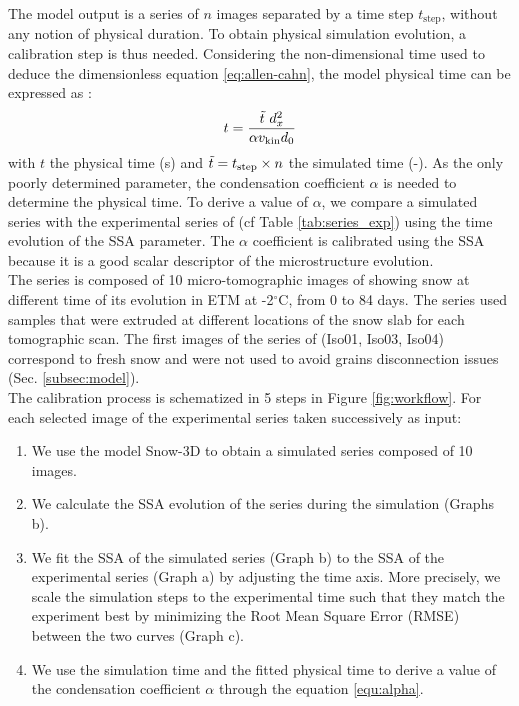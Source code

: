 \documentclass[draft,ms]{agujournal2019}
\begin{document}
 The model output is a series of $n$ images separated by a time step $t_{\mathrm{step}}$, without any notion of physical duration. To obtain physical simulation evolution, a calibration step is thus needed.
Considering the non-dimensional time used to deduce the dimensionless equation \eqref{eq:allen-cahn}, the model physical time can be expressed as \cite{bretin_and_denis_discrete-continuous_2015}: 
\begin{equation}\label{equ:alpha}
   t = \frac{\Tilde{t}\ d_x^2}{\alpha v_{\mathrm{kin}} d_0}
\end{equation}
with $t$ the physical time (s) and $\Tilde{t} = t_{\mathrm{step}} \times n$ the simulated time (-). As the only poorly determined parameter, the condensation coefficient $\alpha$ is needed to determine the physical time. To derive a value of $\alpha$, we compare a simulated series with the experimental series of  (cf Table \ref{tab:series_exp}) using the time evolution of the SSA parameter. The $\alpha$ coefficient is calibrated using the SSA because it is a good scalar descriptor of the microstructure evolution.\\
The series is composed of 10 micro-tomographic images of showing snow at different time of its evolution in ETM at -2$^\circ$C, from 0 to 84 days. The series used samples that were extruded at different locations of the snow slab for each tomographic scan. The first images of the series of  (Iso01, Iso03, Iso04) correspond to fresh snow and were not used to avoid grains disconnection issues (Sec. \ref{subsec:model}).\\
The calibration process is schematized in 5 steps in Figure \ref{fig:workflow}. For each selected image of the experimental series taken successively as input: \\
\begin{enumerate}
    \item We use the model Snow-3D to obtain a simulated series composed of 10 images. 
    \item We calculate the SSA evolution of the series during the simulation (Graphs b).
    \item We fit the SSA of the simulated series (Graph b) to the SSA of the experimental series (Graph a) by adjusting the time axis. More precisely, we scale the simulation steps to the experimental time such that they match the experiment best by minimizing the Root Mean Square Error (RMSE) between the two curves (Graph c).   
    \item We use the simulation time and the fitted physical time to derive a value of the condensation coefficient $\alpha$ through the equation \eqref{equ:alpha}. 
\end{enumerate}
\end{document}
